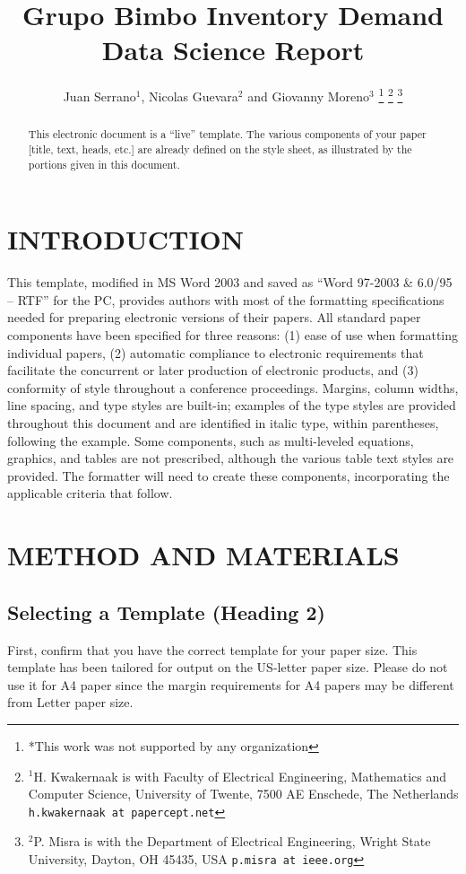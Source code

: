 \documentclass[letterpaper, 10 pt, conference]{ieeeconf}  %
\title{\LARGE \bf
Grupo Bimbo Inventory Demand Data Science Report}
\author{Juan Serrano$^{1}$, Nicolas Guevara$^{2}$ and Giovanny Moreno$^{3}$%
\thanks{*This work was not supported by any organization}%
\thanks{$^{1}$H. Kwakernaak is with Faculty of Electrical Engineering, Mathematics and Computer Science,
        University of Twente, 7500 AE Enschede, The Netherlands
        {\tt\small h.kwakernaak at papercept.net}}%
\thanks{$^{2}$P. Misra is with the Department of Electrical Engineering, Wright State University,
        Dayton, OH 45435, USA
        {\tt\small p.misra at ieee.org}}%
}
\begin{document}
\maketitle
\thispagestyle{empty}
\pagestyle{empty}


\begin{abstract}

This electronic document is a ``live'' template. The various components of your paper [title, text, heads, etc.] are already defined on the style sheet, as illustrated by the portions given in this document.

\end{abstract}


\section{INTRODUCTION}

This template, modified in MS Word 2003 and saved as ``Word 97-2003 \& 6.0/95 -- RTF'' for the PC, provides authors with most of the formatting specifications needed for preparing electronic versions of their papers. All standard paper components have been specified for three reasons: (1) ease of use when formatting individual papers, (2) automatic compliance to electronic requirements that facilitate the concurrent or later production of electronic products, and (3) conformity of style throughout a conference proceedings. Margins, column widths, line spacing, and type styles are built-in; examples of the type styles are provided throughout this document and are identified in italic type, within parentheses, following the example. Some components, such as multi-leveled equations, graphics, and tables are not prescribed, although the various table text styles are provided. The formatter will need to create these components, incorporating the applicable criteria that follow.

\section{METHOD AND MATERIALS}

\subsection{Selecting a Template (Heading 2)}

First, confirm that you have the correct template for your paper size. This template has been tailored for output on the US-letter paper size. Please do not use it for A4 paper since the margin requirements for A4 papers may be different from Letter paper size.
\end{document}
